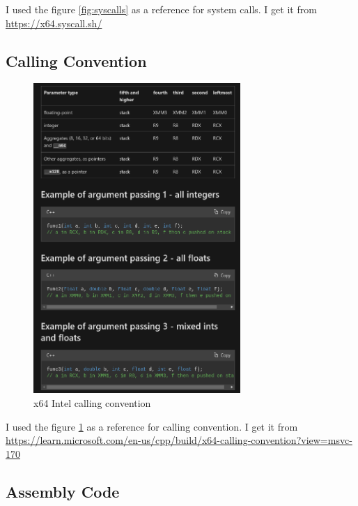 \documentclass{article}
\begin{document}
I used the figure \ref{fig:syscalls} as a reference for system calls. I get it from \url{https://x64.syscall.sh/}

\subsection{Calling Convention}

\begin{figure}[H]
    \centering
    \includegraphics[width=0.7\textwidth]{calling_convention.png}
    \caption{x64 Intel calling convention}
    \label{fig:calling_convention}
\end{figure}

I used the figure \ref{fig:calling_convention} as a reference for calling convention. I get it from \url{https://learn.microsoft.com/en-us/cpp/build/x64-calling-convention?view=msvc-170}

\subsection{Assembly Code}
\end{document}
